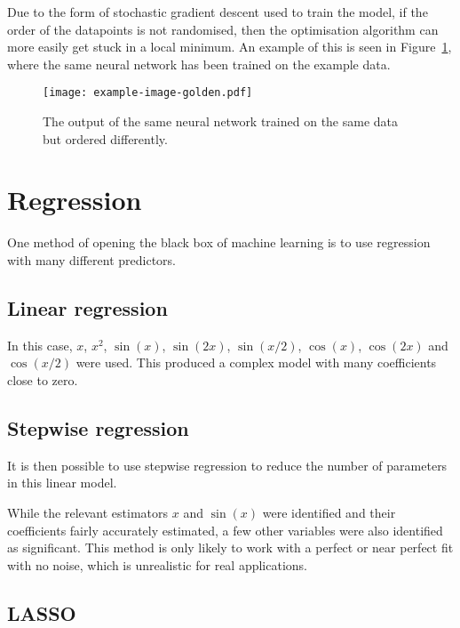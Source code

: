 Due to the form of stochastic gradient descent used to train the model, if the order of the datapoints is not randomised, then the optimisation algorithm can more easily get stuck in a local minimum.
An example of this is seen in Figure~\ref{fig:ann-order}, where the same neural network has been trained on the example data.

\begin{figure}[htbp]
	\centering
	\texttt{[image: example-image-golden.pdf]}
	\caption{The output of the same neural network trained on the same data but ordered differently.}
	\label{fig:ann-order}
\end{figure}


\section{Regression}

One method of opening the black box of machine learning is to use regression with many different predictors.

\subsection{Linear regression}

In this case, \(x\), \(x^2\), \(\sin(x)\), \(\sin(2x)\), \(\sin(x/2)\), \(\cos(x)\), \(\cos(2x)\) and \(\cos(x/2)\) were used.
This produced a complex model with many coefficients close to zero.


\subsection{Stepwise regression}

It is then possible to use stepwise regression to reduce the number of parameters in this linear model.


While the relevant estimators \(x\) and \(\sin(x)\) were identified and their coefficients fairly accurately estimated, a few other variables were also identified as significant.
This method is only likely to work with a perfect or near perfect fit with no noise, which is unrealistic for real applications.

\subsection{LASSO}

